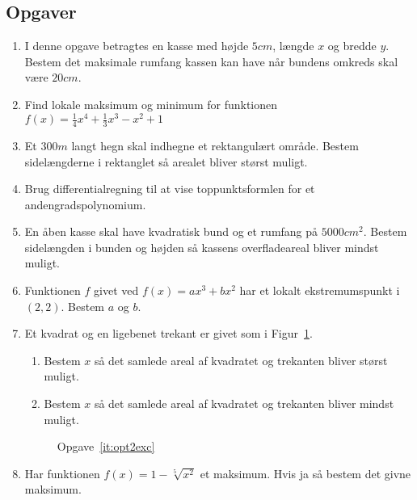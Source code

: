 \subsection{Opgaver}

\begin{enumerate}
	
	
	\item I denne opgave betragtes en kasse med højde $5cm$, længde $x$ og bredde $y$. Bestem det maksimale rumfang kassen kan have når bundens omkreds skal være $20cm$. 
	
	\item Find lokale maksimum og minimum for funktionen $f(x)=\frac{1}{4}x^4+\frac{1}{3}x^3-x^2+1$
	
	\item Et $ 300m $ langt hegn skal indhegne et rektangulært område. Bestem sidelængderne i rektanglet så arealet bliver størst muligt. 
	
	\item Brug differentialregning til at vise toppunktsformlen for et andengradspolynomium.
	
	\item En åben kasse skal have kvadratisk bund og et rumfang på $ 5000 cm^2 $. Bestem sidelængden i bunden og højden så kassens overfladeareal bliver mindst muligt.
	
	\item Funktionen $f$ givet ved $f(x)=ax^3+bx^2$ har et lokalt ekstremumspunkt i $(2,2)$. Bestem $a$ og $b$.
		
	\item \label{it:opt2exc} Et kvadrat og en ligebenet trekant er givet som i Figur~\ref{fig:opt2exc}.
	\begin{enumerate}
		\item Bestem $x$ så det samlede areal af kvadratet og trekanten bliver størst muligt.
		\item Bestem $x$ så det samlede areal af kvadratet og trekanten bliver mindst muligt.
	\end{enumerate}
	
		\begin{figure}
		\centering
		\caption{Opgave~\ref{it:opt2exc}}
		\label{fig:opt2exc}
	\end{figure} 
	
	\item Har funktionen $f(x)=1-\sqrt[5]{x^2}$ et maksimum. Hvis ja så bestem det givne maksimum.
	


\end{enumerate}
